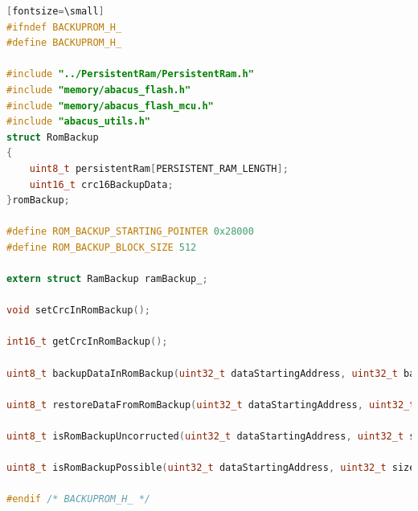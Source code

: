 \documentclass[LaM,binding=0.6cm]{../sapthesis}
\begin{document}
\begin{lstlisting}[language=c][fontsize=\small]
#ifndef BACKUPROM_H_
#define BACKUPROM_H_

#include "../PersistentRam/PersistentRam.h"
#include "memory/abacus_flash.h"
#include "memory/abacus_flash_mcu.h"
#include "abacus_utils.h"
struct RomBackup
{
    uint8_t persistentRam[PERSISTENT_RAM_LENGTH];
    uint16_t crc16BackupData;
}romBackup;

#define ROM_BACKUP_STARTING_POINTER 0x28000
#define ROM_BACKUP_BLOCK_SIZE 512

extern struct RamBackup ramBackup_;

void setCrcInRomBackup();

int16_t getCrcInRomBackup();

uint8_t backupDataInRomBackup(uint32_t dataStartingAddress, uint32_t backupStartingPointer, uint32_t size);

uint8_t restoreDataFromRomBackup(uint32_t dataStartingAddress, uint32_t backupStartingPointer, uint32_t size);

uint8_t isRomBackupUncorructed(uint32_t dataStartingAddress, uint32_t size);

uint8_t isRomBackupPossible(uint32_t dataStartingAddress, uint32_t size);

#endif /* BACKUPROM_H_ */


\end{lstlisting}
\end{document}
